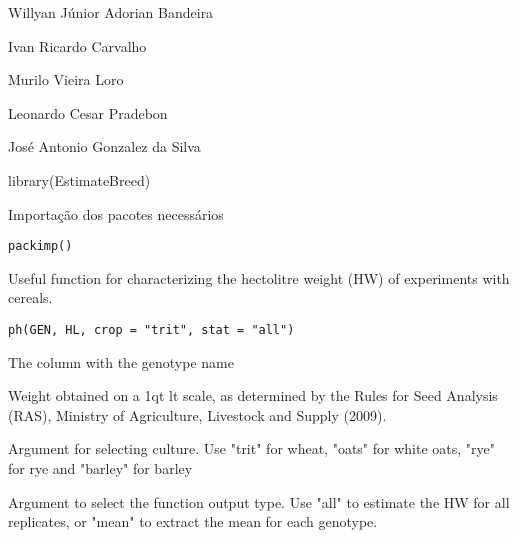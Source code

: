 \documentclass[a4paper]{book}
\begin{document}
%
\begin{Author}
Willyan Júnior Adorian Bandeira

Ivan Ricardo Carvalho

Murilo Vieira Loro

Leonardo Cesar Pradebon

José Antonio Gonzalez da Silva
\end{Author}
%
\begin{Examples}
\begin{ExampleCode}

library(EstimateBreed)


\end{ExampleCode}
\end{Examples}
%
\begin{Description}
Importação dos pacotes necessários
\end{Description}
%
\begin{Usage}
\begin{verbatim}
packimp()
\end{verbatim}
\end{Usage}
%
\begin{Description}
Useful function for characterizing the hectolitre weight (HW) of experiments
with cereals.
\end{Description}
%
\begin{Usage}
\begin{verbatim}
ph(GEN, HL, crop = "trit", stat = "all")
\end{verbatim}
\end{Usage}
%
\begin{Arguments}
\begin{ldescription}
\item[\code{GEN}] The column with the genotype name

\item[\code{HL}] Weight obtained on a 1qt lt scale, as determined by the
Rules for Seed Analysis (RAS), Ministry of Agriculture,
Livestock and Supply (2009).

\item[\code{crop}] Argument for selecting culture. Use "trit" for wheat, "oats" for
white oats, "rye" for rye and "barley" for barley

\item[\code{stat}] Argument to select the function output type. Use "all" to estimate
the HW for all replicates, or "mean" to extract the mean for each genotype.
\end{ldescription}
\end{Arguments}
\end{document}
